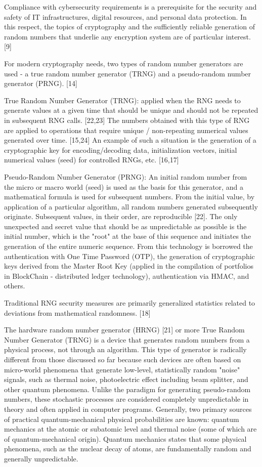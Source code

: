 \documentclass[runningheads]{llncs}
\begin{document}
Compliance with cybersecurity requirements is a prerequisite for the security and safety of IT infrastructures, digital resources, and personal data protection. In this respect, the topics of cryptography and the sufficiently reliable generation of random numbers that underlie any encryption system are of particular interest. [9]

For modern cryptography needs, two types of random number generators are used - a true random number generator (TRNG) and a pseudo-random number generator (PRNG). [14] 

True Random Number Generator (TRNG): applied when the RNG needs to generate values at a given time that should be unique and should not be repeated in subsequent RNG calls. [22,23] The numbers obtained with this type of RNG are applied to operations that require unique / non-repeating numerical values generated over time. [15,24] An example of such a situation is the generation of a cryptographic key for encoding/decoding data, initialization vectors, initial numerical values (seed) for controlled RNGs, etc. [16,17]

Pseudo-Random Number Generator (PRNG): An initial random number from the micro or macro world (seed) is used as the basis for this generator, and a mathematical formula is used for subsequent numbers. From the initial value, by application of a particular algorithm, all random numbers generated subsequently originate. Subsequent values, in their order, are reproducible [22]. The only unexpected and secret value that should be as unpredictable as possible is the initial number, which is the "root" at the base of this sequence and initiates the generation of the entire numeric sequence. From this technology is borrowed the authentication with One Time Password (OTP), the generation of cryptographic keys derived from the Master Root Key (applied in the compilation of portfolios in BlockChain - distributed ledger technology), authentication via HMAC, and others.

Traditional RNG security measures are primarily generalized statistics related to deviations from mathematical randomness. [18]

The hardware random number generator (HRNG) [21] or more True Random Number Generator (TRNG) is a device that generates random numbers from a physical process, not through an algorithm. This type of generator is radically different from those discussed so far because such devices are often based on micro-world phenomena that generate low-level, statistically random "noise" signals, such as thermal noise, photoelectric effect including beam splitter, and other quantum phenomena. Unlike the paradigm for generating pseudo-random numbers, these stochastic processes are considered completely unpredictable in theory and often applied in computer programs. Generally, two primary sources of practical quantum-mechanical physical probabilities are known: quantum mechanics at the atomic or subatomic level and thermal noise (some of which are of quantum-mechanical origin). Quantum mechanics states that some physical phenomena, such as the nuclear decay of atoms, are fundamentally random and generally unpredictable.
\end{document}
